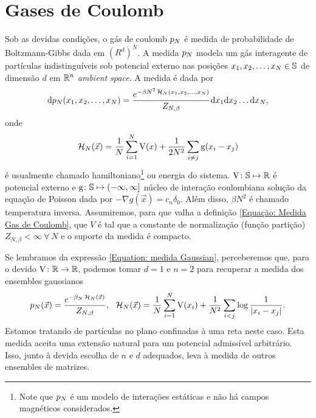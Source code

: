 \section{Gases de Coulomb}
\label{Section: Gases de Coulomb}

Sob as devidas condições, o gás de coulomb $p_N$ \cite{ChafaCoulombMeasure} é medida de probabilidade de Boltzmann-Gibbs dada em $(R^d)^N$. A medida $p_N$ modela um gás interagente de partículas indistinguíveis sob potencial externo nas posições $x_1, x_2, \dots, x_N \in \mathbb{S}$ de dimensão $d$ em $\mathbb{R}^n$ \textit{ambient space}. A medida é dada por 
\begin{equation}
	\dd p_N(x_1, x_2, \dots, x_N) = \frac{e^{-\beta N^2 \operatorname{\mathcal{H}}_N(x_1, x_2, \dots, x_N)}}{Z_{N,\beta}} \dd x_1  \dd x_2  \dots  \dd x_N,
	\label{Equação: Medida Gas de Coulomb}
\end{equation}
onde $$\operatorname{\mathcal{H}}_N(\vec{x}) = \frac{1}{N} \sum_{i = 1}^{N} \operatorname{V}(x) + \frac{1}{2N^2} \sum_{i \neq j} \operatorname{g}(x_i - x_j)$$ é usualmente chamado hamiltoniano\footnote{Note que $p_N$ é um modelo de interações estáticas e não há campos magnéticos considerados.} ou energia do sistema. $\operatorname{V} \colon \mathbb{S} \mapsto \mathbb{R}$ é potencial externo e $\operatorname{g} \colon \mathbb{S} \mapsto (-\infty, \infty]$ núcleo de interação coulombiana solução da equação de Poisson dada por $- \nabla g(\vec{x}) = c_n\delta_0$. Além disso, $\beta N^2$ é chamado temperatura inversa. Assumiremos, para que valha a definição \ref{Equação: Medida Gas de Coulomb}, que $V$ é tal que a constante de normalização (função partição) $Z_{N, \beta} < \infty \ \forall \ N$ e o suporte da medida é compacto.

Se lembramos da expressão \ref{Equation: medida Gaussian}, perceberemos que, para o devido $\operatorname{V} \colon \mathbb{R} \rightarrow \mathbb{R}$, podemos tomar $d=1$ e $n = 2$ para recuperar a medida dos ensembles gaussianos 
\begin{equation}
	p_N(\vec{x}) = \frac{e^{-\beta_N \operatorname{\mathcal{H}}_N(\vec{x})}}{Z_{N,\beta}}, \ \ \operatorname{\mathcal{H}}_N(\vec{x}) = \frac{1}{N} \sum_{i = 1}^{N} \operatorname{V}(x_i) + \frac{1}{N^2} \sum_{i < j} \log{\frac{1}{|x_i - x_j|}}.
	\label{Equation: Medida Log V}
\end{equation}
Estamos tratando de partículas no plano confinadas à uma reta neste caso. Esta medida aceita uma extensão natural para um potencial admissível arbitrário. Isso, junto à devida escolha de $n$ e $d$ adequados, leva à medida de outros ensembles de matrizes.